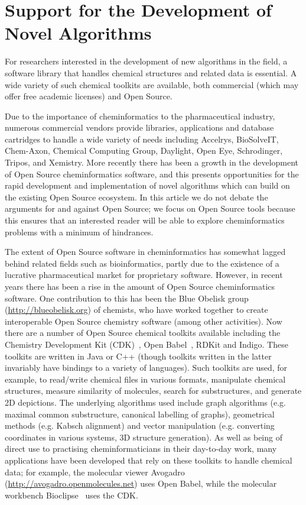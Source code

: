 \documentclass{sig-alternate}
\begin{document}
\section{Support for the Development of Novel Algorithms}
\label{sec:development-support}

For researchers interested in the development of new algorithms in the
field, a software library that handles chemical structures and related
data is essential. A wide variety of such chemical toolkits are
available, both commercial (which may offer free academic
licenses) and Open Source.

Due to the importance of cheminformatics to the pharmaceutical
industry, numerous commercial vendors provide libraries,
applications and database cartridges to handle a wide variety of
needs including Accelrys, BioSolveIT, Chem-Axon, Chemical Computing Group,
Daylight, Open Eye, Schrodinger, Tripos, and Xemistry. More recently
there has been a growth in the development of Open
Source cheminformatics software, and this presents opportunities for
the rapid development and implementation of novel algorithms which can
build on the existing Open Source ecosystem. In this article we do not debate the
arguments for and against Open Source; we focus on Open Source
tools because this ensures that an interested reader will be able to explore
cheminformatics problems with a minimum of hindrances.

The extent of Open Source software in cheminformatics has somewhat
lagged behind related fields such as bioinformatics, partly due to the
existence of a lucrative pharmaceutical market for proprietary
software. However, in recent years there has been a rise in the amount
of Open Source cheminformatics software. One contribution to this has
been the Blue Obelisk group~\cite{BlueObelisk2011}
(\url{http://blueobelisk.org}) of chemists, who have worked together
to create interoperable Open Source chemistry software (among other
activities). Now there are a number of Open Source chemical toolkits
available including the Chemistry Development Kit
(CDK)~\cite{steinbeck2003}, Open Babel~\cite{openbabel2011}, RDKit and
Indigo. These toolkits are written in Java or C++ (though toolkits
written in the latter invariably have bindings to a variety of
languages). Such toolkits are used, for example, to read/write
chemical files in various formats, manipulate chemical structures, measure
similarity of molecules, search for substructures, and generate 2D
depictions. The underlying algorithms used include graph algorithms
(e.g. maximal common substructure, canonical labelling of graphs),
geometrical methods (e.g. Kabsch alignment) and vector manipulation
(e.g. converting coordinates in various systems, 3D structure
generation). As well as being of direct use to practising
cheminformaticians in their day-to-day work, many applications have
been developed that rely on these toolkits to handle chemical data;
for example, the molecular viewer Avogadro
(\url{http://avogadro.openmolecules.net}) uses Open Babel, while the
molecular workbench Bioclipse~\cite{Bioclipse2} uses the CDK.
\end{document}

